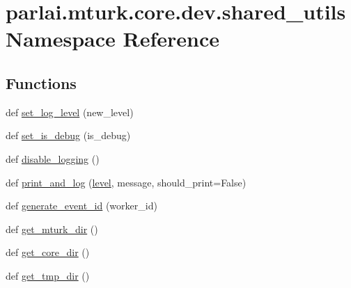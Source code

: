 \hypertarget{namespaceparlai_1_1mturk_1_1core_1_1dev_1_1shared__utils}{}\section{parlai.\+mturk.\+core.\+dev.\+shared\+\_\+utils Namespace Reference}
\label{namespaceparlai_1_1mturk_1_1core_1_1dev_1_1shared__utils}
\subsection*{Functions}
\begin{DoxyCompactItemize}
\item 
def \hyperlink{namespaceparlai_1_1mturk_1_1core_1_1dev_1_1shared__utils_a2d38b1a3db8a14e8fd0b37519d94a25d}{set\+\_\+log\+\_\+level} (new\+\_\+level)
\item 
def \hyperlink{namespaceparlai_1_1mturk_1_1core_1_1dev_1_1shared__utils_ab4f57426e99620d33845f619d7697eb4}{set\+\_\+is\+\_\+debug} (is\+\_\+debug)
\item 
def \hyperlink{namespaceparlai_1_1mturk_1_1core_1_1dev_1_1shared__utils_aeb3b524d0d90cbea1e509a09b3dc7bf5}{disable\+\_\+logging} ()
\item 
def \hyperlink{namespaceparlai_1_1mturk_1_1core_1_1dev_1_1shared__utils_aaf34fac6f7340bd67e9cb62283bc3a28}{print\+\_\+and\+\_\+log} (\hyperlink{namespaceparlai_1_1mturk_1_1core_1_1dev_1_1shared__utils_a907236e6bd0c0e3b728a25c4925ec851}{level}, message, should\+\_\+print=False)
\item 
def \hyperlink{namespaceparlai_1_1mturk_1_1core_1_1dev_1_1shared__utils_a95fa6a517a734351c159f2811d04af05}{generate\+\_\+event\+\_\+id} (worker\+\_\+id)
\item 
def \hyperlink{namespaceparlai_1_1mturk_1_1core_1_1dev_1_1shared__utils_a1a7ab908ecffbfc1fabb5222625d35a2}{get\+\_\+mturk\+\_\+dir} ()
\item 
def \hyperlink{namespaceparlai_1_1mturk_1_1core_1_1dev_1_1shared__utils_aead9ab64df5040f7a479ea81deea353c}{get\+\_\+core\+\_\+dir} ()
\item 
def \hyperlink{namespaceparlai_1_1mturk_1_1core_1_1dev_1_1shared__utils_a3bb51eaf0110918e082cae3ffd14d4d0}{get\+\_\+tmp\+\_\+dir} ()
\end{DoxyCompactItemize}
